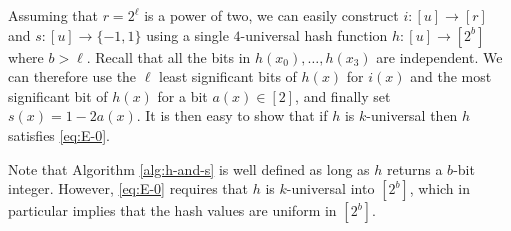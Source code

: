 Assuming that $r=2^\ell$ is a power of two, we can easily construct
$i:[u]\to[r]$ and $s:[u]\to\{-1,1\}$ using a single $4$-universal
hash function $h:[u]\to[2^b]$ where $b>\ell$. Recall that all the bits in
$h(x_0),\ldots,h(x_3)$ are independent. We can therefore use the
$\ell$ least significant bits of $h(x)$ for $i(x)$ and the most
significant bit of $h(x)$ for a bit $a(x)\in[2]$, and finally set
$s(x)=1-2a(x)$. It is then easy to show that if $h$ is $k$-universal
then $h$ satisfies \cref{eq:E-0}.
Note that Algorithm \ref{alg:h-and-s} is well defined as long as 
$h$ returns a $b$-bit integer. However, \cref{eq:E-0} requires
that $h$ is $k$-universal into $[2^b]$, which in particular implies that
the hash values are uniform in $[2^b]$.


